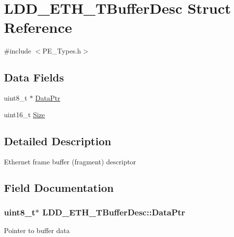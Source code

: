 \hypertarget{struct_l_d_d___e_t_h___t_buffer_desc}{}\section{L\+D\+D\+\_\+\+E\+T\+H\+\_\+\+T\+Buffer\+Desc Struct Reference}
\label{struct_l_d_d___e_t_h___t_buffer_desc}


{\ttfamily \#include $<$P\+E\+\_\+\+Types.\+h$>$}

\subsection*{Data Fields}
\begin{DoxyCompactItemize}
\item 
uint8\+\_\+t $\ast$ \hyperlink{struct_l_d_d___e_t_h___t_buffer_desc_af9049f0d40faa480a4de3532a1de4605}{Data\+Ptr}
\item 
uint16\+\_\+t \hyperlink{struct_l_d_d___e_t_h___t_buffer_desc_abddc4273b732d3cf44ff0b6870d6b87a}{Size}
\end{DoxyCompactItemize}


\subsection{Detailed Description}
Ethernet frame buffer (fragment) descriptor 

\subsection{Field Documentation}
\subsubsection[{\texorpdfstring{Data\+Ptr}{DataPtr}}]{\setlength{\rightskip}{0pt plus 5cm}uint8\+\_\+t$\ast$ L\+D\+D\+\_\+\+E\+T\+H\+\_\+\+T\+Buffer\+Desc\+::\+Data\+Ptr}\hypertarget{struct_l_d_d___e_t_h___t_buffer_desc_af9049f0d40faa480a4de3532a1de4605}{}\label{struct_l_d_d___e_t_h___t_buffer_desc_af9049f0d40faa480a4de3532a1de4605}
Pointer to buffer data 
